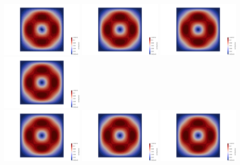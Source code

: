 \begin{center}
\includegraphics[width=4cm]{python_codes/fieldstone_78/results/mms_dh/16x16/vel0000}
\includegraphics[width=4cm]{python_codes/fieldstone_78/results/mms_dh/16x16/vel0001}
\includegraphics[width=4cm]{python_codes/fieldstone_78/results/mms_dh/16x16/vel0002}
\includegraphics[width=4cm]{python_codes/fieldstone_78/results/mms_dh/16x16/vel0003}\\
\includegraphics[width=4cm]{python_codes/fieldstone_78/results/mms_dh/16x16/vel0004}
\includegraphics[width=4cm]{python_codes/fieldstone_78/results/mms_dh/16x16/vel0005}
\includegraphics[width=4cm]{python_codes/fieldstone_78/results/mms_dh/16x16/vel0006}

\end{center}

